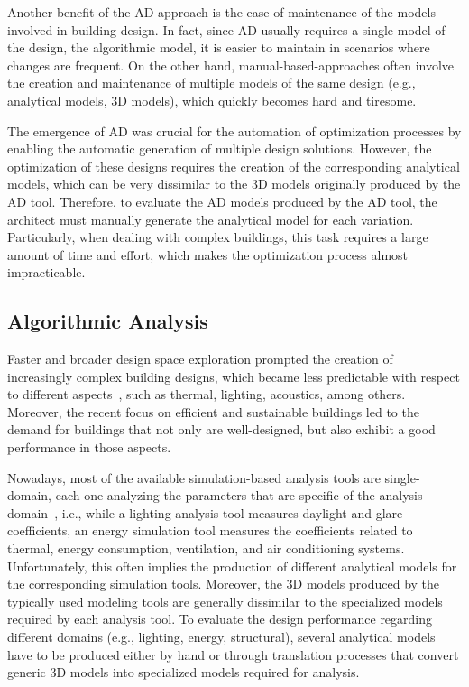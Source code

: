 Another benefit of the \ac{AD} approach is the ease of maintenance of the models involved in building design. In fact, since \ac{AD} usually requires a single model of the design, the algorithmic model, it is easier to maintain in scenarios where changes are frequent. On the other hand, manual-based-approaches often involve the creation and maintenance of multiple models of the same design (e.g., analytical models, 3D models), which quickly becomes hard and tiresome.

The emergence of \ac{AD} was crucial for the automation of optimization processes by enabling the automatic generation of multiple design solutions. However, the optimization of these designs requires the creation of the corresponding analytical models, which can be very dissimilar to the 3D models originally produced by the \ac{AD} tool. Therefore, to evaluate the \ac{AD} models produced by the \ac{AD} tool, the architect must manually generate the analytical model for each variation. Particularly, when dealing with complex buildings, this task requires a large amount of time and effort, which makes the optimization process almost impracticable.

\subsection{Algorithmic Analysis}

Faster and broader design space exploration prompted the creation of increasingly complex building designs, which became less predictable with respect to different aspects~\cite{Branco2017AD}, such as thermal, lighting, acoustics, among others. Moreover, the recent focus on efficient and sustainable buildings led to the demand for buildings that not only are well-designed, but also exhibit a good performance in those aspects.
	
Nowadays, most of the available simulation-based analysis tools are single-domain, each one analyzing the parameters that are specific of the analysis domain~\cite{Malkawi2005}, i.e., while a lighting analysis tool measures daylight and glare coefficients, an energy simulation tool measures the coefficients related to thermal, energy consumption, ventilation, and air conditioning systems. Unfortunately, this often implies the production of different analytical models for the corresponding simulation tools. Moreover, the 3D models produced by the typically used modeling tools are generally dissimilar to the specialized models required by each analysis tool. To evaluate the design performance regarding different domains (e.g., lighting, energy, structural), several analytical models have to be produced either by hand or through translation processes that convert generic 3D models into specialized models required for analysis.

